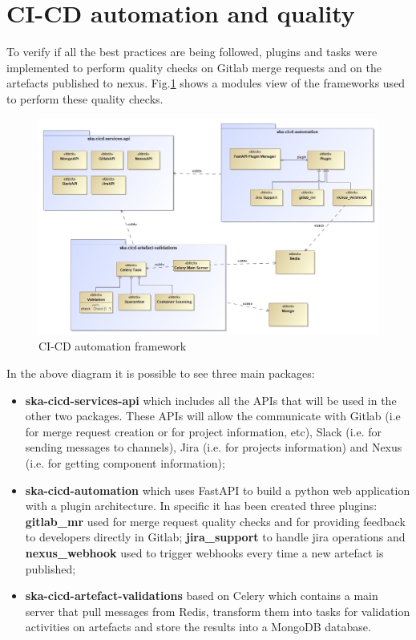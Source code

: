 \documentclass[a4paper,
               keeplastbox,   %
               ]{jacow}
\begin{document}
\section{CI-CD automation and quality}

To verify if all the best practices are being followed, plugins and tasks were implemented to perform quality checks on Gitlab merge requests and on the artefacts published to nexus. Fig.\ref{fig:CICD-automation-quality} shows a modules view of the frameworks used to perform these quality checks. 

\begin{figure}[!htb]
    \centering
    \includegraphics*[width=0.8\columnwidth]{CICD-automation-quality}
    \caption{CI-CD automation framework}
    \label{fig:CICD-automation-quality}
 \end{figure}
 
 In the above diagram it is possible to see three main packages:
 
 \begin{itemize}
    \item \textbf{ska-cicd-services-api}\cite{ska-cicd-services-api} which includes all the APIs that will be used in the other two packages. These APIs will allow the communicate with Gitlab (i.e for merge request creation or for project information, etc), Slack\cite{slack} (i.e. for sending messages to channels), Jira \cite{jira} (i.e. for projects information) and Nexus (i.e. for getting component information);
    \item \textbf{ska-cicd-automation}\cite{ska-cicd-automation} which uses FastAPI \cite{fastapi} to build a python web application with a plugin architecture. In specific it has been created three plugins: \textbf{gitlab\_mr} used for merge request quality checks and for providing feedback to developers directly in Gitlab; \textbf{jira\_support} to handle jira operations and \textbf{nexus\_webhook} used to trigger webhooks every time a new artefact is published;
    \item \textbf{ska-cicd-artefact-validations}\cite{ska-cicd-artefact-validations} based on Celery\cite{celery} which contains a main server that pull messages from Redis\cite{redis}, transform them into tasks for validation activities on artefacts and store the results into a MongoDB\cite{mongo} database. 
 \end{itemize}
 
\end{document}
